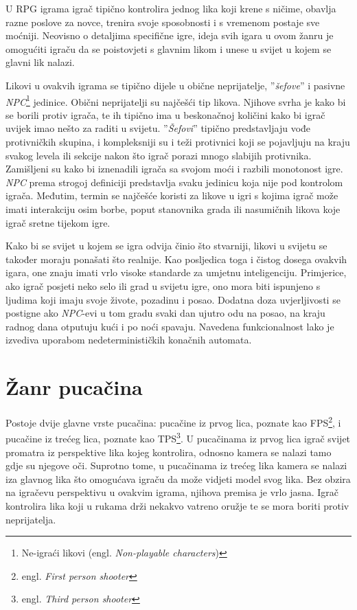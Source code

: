 \documentclass[times, utf8, zavrsni, numeric]{fer}
\begin{document}
\par U RPG igrama igrač tipično kontrolira jednog lika koji krene s ničime, obavlja razne poslove za novce, trenira svoje sposobnosti i s vremenom postaje sve moćniji. 
Neovisno o detaljima specifične igre, ideja svih igara u ovom žanru je omogućiti igraču da se poistovjeti s glavnim likom i unese u svijet u kojem se glavni lik nalazi.

\par Likovi u ovakvih igrama se tipično dijele u obične neprijatelje, ''\textit{šefove}'' i pasivne \textit{NPC}\footnote{Ne-igraći likovi         
(engl. \textit{Non-playable characters})} jedinice.
Obični neprijatelji su najčešći tip likova.
Njihove svrha je kako bi se borili protiv igrača, te ih tipično ima u beskonačnoj količini kako bi igrač uvijek imao nešto za raditi u svijetu.
''\textit{Šefovi}'' tipično predstavljaju vođe protivničkih skupina, i kompleksniji su i teži protivnici koji se pojavljuju na kraju svakog levela ili sekcije nakon što igrač porazi mnogo slabijih protivnika.
Zamišljeni su kako bi iznenadili igrača sa svojom moći i razbili monotonost igre.
\textit{NPC} prema strogoj definiciji predstavlja svaku jedinicu koja nije pod kontrolom igrača. 
Međutim, termin se najčešće koristi za likove u igri s kojima igrač može imati interakciju osim borbe, poput stanovnika grada ili nasumičnih likova koje igrač sretne tijekom igre.

\par Kako bi se svijet u kojem se igra odvija činio što stvarniji, likovi u svijetu se također moraju ponašati što realnije.
Kao posljedica toga i čistog dosega ovakvih igara, one znaju imati vrlo visoke standarde za umjetnu inteligenciju.
Primjerice, ako igrač posjeti neko selo ili grad u svijetu igre, ono mora biti ispunjeno s ljudima koji imaju svoje živote, pozadinu i posao.
Dodatna doza uvjerljivosti se postigne ako \textit{NPC}-evi u tom gradu svaki dan ujutro odu na posao, na kraju radnog dana otputuju kući i po noći spavaju.
Navedena funkcionalnost lako je izvediva uporabom nedeterminističkih konačnih automata\cite{book:AIGameProgrammingWisdom}.

\section{Žanr pucačina}

\par Postoje dvije glavne vrste pucačina: pucačine iz prvog lica, poznate kao FPS\footnote{engl. \textit{First person shooter}}, i pucačine iz trećeg lica, poznate kao TPS\footnote{engl. \textit{Third person shooter}}.
U pucačinama iz prvog lica igrač svijet promatra iz perspektive lika kojeg kontrolira, odnosno kamera se nalazi tamo gdje su njegove oči.
Suprotno tome, u pucačinama iz trećeg lika kamera se nalazi iza glavnog lika što omogućava igraču da može vidjeti model svog lika.
Bez obzira na igračevu perspektivu u ovakvim igrama, njihova premisa je vrlo jasna.
Igrač kontrolira lika koji u rukama drži nekakvo vatreno oružje te se mora boriti protiv neprijatelja.
\end{document}
